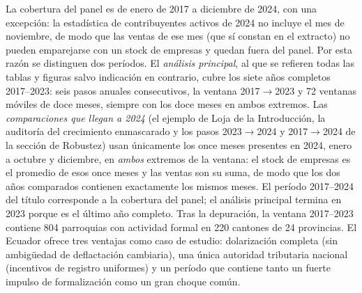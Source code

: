 \documentclass[12pt,a4paper]{article}
\begin{document}
\par\vspace{6pt}
La cobertura del panel es de enero de 2017 a diciembre de 2024, con una excepción: la estadística de contribuyentes activos de 2024 no incluye el mes de noviembre, de modo que las ventas de ese mes (que sí constan en el extracto) no pueden emparejarse con un stock de empresas y quedan fuera del panel. Por esta razón se distinguen dos períodos. El \textit{análisis principal}, al que se refieren todas las tablas y figuras salvo indicación en contrario, cubre los siete años completos 2017--2023: seis pasos anuales consecutivos, la ventana 2017$\to$2023 y 72 ventanas móviles de doce meses, siempre con los doce meses en ambos extremos. Las \textit{comparaciones que llegan a 2024} (el ejemplo de Loja de la Introducción, la auditoría del crecimiento enmascarado y los pasos 2023$\to$2024 y 2017$\to$2024 de la sección de Robustez) usan únicamente los once meses presentes en 2024, enero a octubre y diciembre, en \textit{ambos} extremos de la ventana: el stock de empresas es el promedio de esos once meses y las ventas son su suma, de modo que los dos años comparados contienen exactamente los mismos meses. El período 2017--2024 del título corresponde a la cobertura del panel; el análisis principal termina en 2023 porque es el último año completo. Tras la depuración, la ventana 2017--2023 contiene 804 parroquias con actividad formal en 220 cantones de 24 provincias. El Ecuador ofrece tres ventajas como caso de estudio: dolarización completa (sin ambigüedad de deflactación cambiaria), una única autoridad tributaria nacional (incentivos de registro uniformes) y un período que contiene tanto un fuerte impulso de formalización como un gran choque común.
\par
\end{document}

